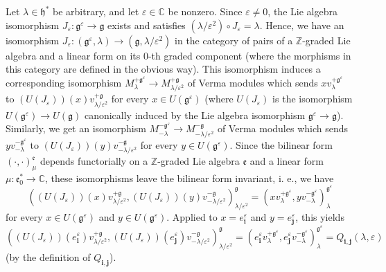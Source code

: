 \documentclass
[numbers=enddot,12pt,final,onecolumn,german,notitlepage]{scrartcl}%
\theoremstyle{definition}
\begin{document}
Let $\lambda\in\mathfrak{h}^{\ast}$ be arbitrary, and let $\varepsilon
\in\mathbb{C}$ be nonzero. Since $\varepsilon\neq0$, the Lie algebra
isomorphism $J_{\varepsilon}:\mathfrak{g}^{\varepsilon}\rightarrow
\mathfrak{g}$ exists and satisfies $\left(  \lambda/\varepsilon^{2}\right)
\circ J_{\varepsilon}=\lambda$. Hence, we have an isomorphism $J_{\varepsilon
}:\left(  \mathfrak{g}^{\varepsilon},\lambda\right)  \rightarrow\left(
\mathfrak{g},\lambda/\varepsilon^{2}\right)  $ in the category of pairs of a
$\mathbb{Z}$-graded Lie algebra and a linear form on its $0$-th graded
component (where the morphisms in this category are defined in the obvious
way). This isomorphism induces a corresponding isomorphism $M_{\lambda
}^{+\mathfrak{g}^{\varepsilon}}\rightarrow M_{\lambda/\varepsilon^{2}%
}^{+\mathfrak{g}}$ of Verma modules which sends $xv_{\lambda}^{+\mathfrak{g}%
^{\varepsilon}}$ to $\left(  U\left(  J_{\varepsilon}\right)  \right)  \left(
x\right)  v_{\lambda/\varepsilon^{2}}^{+\mathfrak{g}}$ for every $x\in
U\left(  \mathfrak{g}^{\varepsilon}\right)  $ (where $U\left(  J_{\varepsilon
}\right)  $ is the isomorphism $U\left(  \mathfrak{g}^{\varepsilon}\right)
\rightarrow U\left(  \mathfrak{g}\right)  $ canonically induced by the Lie
algebra isomorphism $\mathfrak{g}^{\varepsilon}\rightarrow\mathfrak{g}$).
Similarly, we get an isomorphism $M_{-\lambda}^{-\mathfrak{g}^{\varepsilon}%
}\rightarrow M_{-\lambda/\varepsilon^{2}}^{-\mathfrak{g}}$ of Verma modules
which sends $yv_{-\lambda}^{-\mathfrak{g}^{\varepsilon}}$ to $\left(  U\left(
J_{\varepsilon}\right)  \right)  \left(  y\right)  v_{-\lambda/\varepsilon
^{2}}^{-\mathfrak{g}}$ for every $y\in U\left(  \mathfrak{g}^{\varepsilon
}\right)  $. Since the bilinear form $\left(  \cdot,\cdot\right)  _{\mu
}^{\mathfrak{e}}$ depends functorially on a $\mathbb{Z}$-graded Lie algebra
$\mathfrak{e}$ and a linear form $\mu:\mathfrak{e}_{0}^{\ast}\rightarrow
\mathbb{C}$, these isomorphisms leave the bilinear form invariant, i. e., we
have%
\[
\left(  \left(  U\left(  J_{\varepsilon}\right)  \right)  \left(  x\right)
v_{\lambda/\varepsilon^{2}}^{+\mathfrak{g}},\left(  U\left(  J_{\varepsilon
}\right)  \right)  \left(  y\right)  v_{-\lambda/\varepsilon^{2}%
}^{-\mathfrak{g}}\right)  _{\lambda/\varepsilon^{2}}^{\mathfrak{g}}=\left(
xv_{\lambda}^{+\mathfrak{g}^{\varepsilon}},yv_{-\lambda}^{-\mathfrak{g}%
^{\varepsilon}}\right)  _{\lambda}^{\mathfrak{g}^{\varepsilon}}%
\]
for every $x\in U\left(  \mathfrak{g}^{\varepsilon}\right)  $ and $y\in
U\left(  \mathfrak{g}^{\varepsilon}\right)  $. Applied to $x=e_{\mathbf{i}%
}^{\varepsilon}$ and $y=e_{\mathbf{j}}^{\varepsilon}$, this yields%
\[
\left(  \left(  U\left(  J_{\varepsilon}\right)  \right)  \left(
e_{\mathbf{i}}^{\varepsilon}\right)  v_{\lambda/\varepsilon^{2}}%
^{+\mathfrak{g}},\left(  U\left(  J_{\varepsilon}\right)  \right)  \left(
e_{\mathbf{j}}^{\varepsilon}\right)  v_{-\lambda/\varepsilon^{2}%
}^{-\mathfrak{g}}\right)  _{\lambda/\varepsilon^{2}}^{\mathfrak{g}}=\left(
e_{\mathbf{i}}^{\varepsilon}v_{\lambda}^{+\mathfrak{g}^{\varepsilon}%
},e_{\mathbf{j}}^{\varepsilon}v_{-\lambda}^{-\mathfrak{g}^{\varepsilon}%
}\right)  _{\lambda}^{\mathfrak{g}^{\varepsilon}}=Q_{\mathbf{i},\mathbf{j}%
}\left(  \lambda,\varepsilon\right)
\]
(by the definition of $Q_{\mathbf{i},\mathbf{j}}$).
\end{document}
